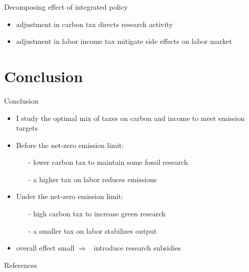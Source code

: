 \documentclass[11pt,aspectratio=169]{beamer}
\newcommand{\ar}{$\Rightarrow$ \ }
\begin{document}
\begin{frame}{Decomposing effect of integrated policy }
\begin{figure}
\begin{subfigure}{0.45\textwidth}
		\end{subfigure}
	\end{figure}
	\vspace{3mm}
	\begin{block}{}
		\begin{itemize}
\item adjustment in carbon tax directs research activity 
\item adjustment in labor income tax mitigate side effects on labor market
		\end{itemize}
	\end{block}	
\end{frame}



\hypertarget{conc}{}
\section{Conclusion}
\begin{frame}{Conclusion}
	\begin{itemize}[<+-| alert@+>]
		\item I study the optimal mix of taxes on carbon and income to meet emission targets
		\vspace{3mm}
		
		\item Before the net-zero emission limit: 
		\begin{itemize}
			\item[-]  lower carbon tax to maintain some fossil research
			\item[-] a higher tax on labor reduces emissions
		\end{itemize}
		\vspace{3mm}
		\item Under the net-zero emission limit: 
		\begin{itemize}
			\item[-] high carbon tax to increase green research
			\item[-]  a smaller tax on labor stabilizes output
		\end{itemize}
		\item overall effect small \ar introduce research subsidies
	\end{itemize}
\end{frame}
\begin{frame}[shrink]{References}



\end{frame}
\end{document}
